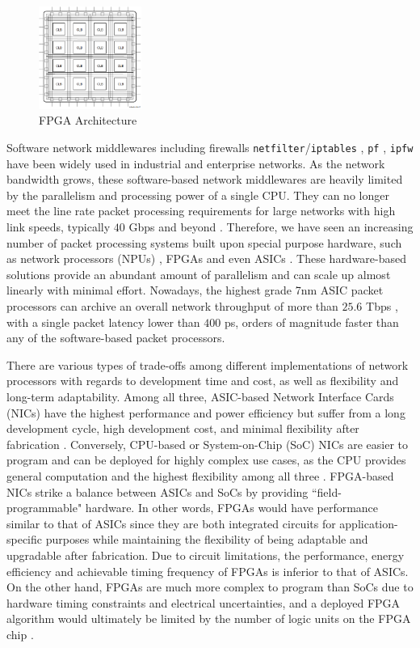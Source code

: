 \documentclass[a4paper]{report}
\newcommand{\code}{\texttt}
\begin{document}
\begin{figure}[h!]
  \centering
  \includegraphics[width=0.3\textwidth]{imgs/fpga-arch.png}
  \caption{FPGA Architecture \cite{xilinx-fpga}}
  \label{fig:fpga-arch}
\end{figure}

Software network middlewares including firewalls \code{netfilter}/\code{iptables} \cite{netfilter-iptables}, \code{pf} \cite{pf}, \code{ipfw} \cite{ipfw} have been widely used in industrial and enterprise networks. As the network bandwidth grows, these software-based network middlewares are heavily limited by the parallelism and processing power of a single CPU. They can no longer meet the line rate packet processing requirements for large networks with high link speeds, typically $40$ Gbps and beyond \cite{fiessler-2016}. Therefore, we have seen an increasing number of packet processing systems built upon special purpose hardware, such as network processors (NPUs) \cite {qi-2007, duo-2006}, FPGAs\cite{hager-2014, fong-2012, jiang-2009, jiang-2009-large} and even ASICs \cite{bosshart-2013}. These hardware-based solutions provide an abundant amount of parallelism and can scale up almost linearly with minimal effort. Nowadays, the highest grade 7nm ASIC packet processors can archive an overall network throughput of more than $25.6$ Tbps \cite{tomahawk-2021}, with a single packet latency lower than $400$ ps, orders of magnitude faster than any of the software-based packet processors.

There are various types of trade-offs among different implementations of network processors with regards to development time and cost, as well as flexibility and long-term adaptability. Among all three, ASIC-based Network Interface Cards (NICs) have the highest performance and power efficiency but suffer from a long development cycle, high development cost, and minimal flexibility after fabrication \cite{amara-2006, deierling-2018}. Conversely, CPU-based or System-on-Chip (SoC) NICs are easier to program and can be deployed for highly complex use cases, as the CPU provides general computation and the highest flexibility among all three \cite{deierling-2018}. FPGA-based NICs strike a balance between ASICs and SoCs by providing ``field-programmable" hardware. In other words, FPGAs would have performance similar to that of ASICs since they are both integrated circuits for application-specific purposes while maintaining the flexibility of being adaptable and upgradable after fabrication. Due to circuit limitations, the performance, energy efficiency and achievable timing frequency of FPGAs is inferior to that of ASICs. On the other hand, FPGAs are much more complex to program than SoCs due to hardware timing constraints and electrical uncertainties, and a deployed FPGA algorithm would ultimately be limited by the number of logic units on the FPGA chip \cite{deierling-2018}.
\end{document}
